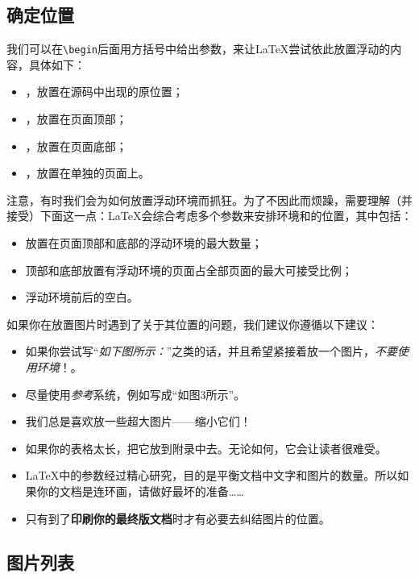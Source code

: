 \subsection{确定位置}

我们可以在\verb|\begin|后面用方括号中给出参数，来让\LaTeX 尝试依此放置浮动的内容，具体如下：

\begin{itemize}
  \item {}，放置在源码中出现的原位置；
  \item {}，放置在页面顶部；
  \item {}，放置在页面底部；
  \item {}，放置在单独的页面上。
\end{itemize}

注意，有时我们会为如何放置浮动环境而抓狂。为了不因此而烦躁，需要理解（并接受）下面这一点：\LaTeX 会综合考虑多个参数来安排环境和的位置，其中包括：

\begin{itemize}
  \item 放置在页面顶部和底部的浮动环境的最大数量；
  \item 顶部和底部放置有浮动环境的页面占全部页面的最大可接受比例；
  \item 浮动环境前后的空白。
\end{itemize}

如果你在放置图片时遇到了关于其位置的问题，我们建议你遵循以下建议：

\begin{itemize}
  \item 如果你尝试写“\textsl{如下图所示：}”之类的话，并且希望紧接着放一个图片，\emph{不要使用环境}！。
  \item 尽量使用\emph{参考}系统，例如写成“如图3所示”。
  \item 我们总是喜欢放一些超大图片——缩小它们！
  \item 如果你的表格太长，把它放到附录中去。无论如何，它会让读者很难受。
  \item \LaTeX 中的参数经过精心研究，目的是平衡文档中文字和图片的数量。所以如果你的文档是连环画，请做好最坏的准备……
  \item 只有到了\textbf{印刷你的最终版文档}时才有必要去纠结图片的位置。
\end{itemize}

\subsection{图片列表}

